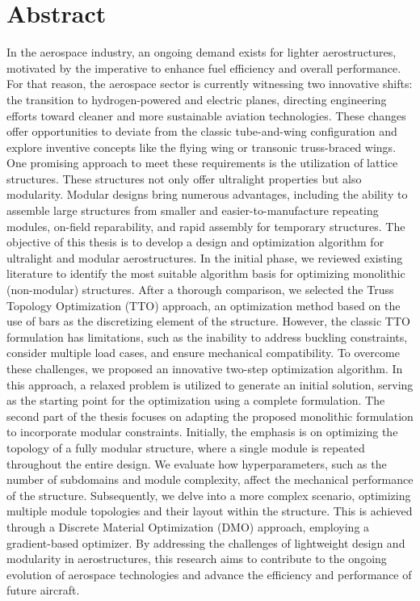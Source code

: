 \chapter*{Abstract}
{}%
%
In the aerospace industry, an ongoing demand exists for lighter aerostructures, motivated by the imperative to enhance fuel efficiency and overall performance. For that reason, the aerospace sector is currently witnessing two innovative shifts: the transition to hydrogen-powered and electric planes, directing engineering efforts toward cleaner and more sustainable aviation technologies. These changes offer opportunities to deviate from the classic tube-and-wing configuration and explore inventive concepts like the flying wing or transonic truss-braced wings. One promising approach to meet these requirements is the utilization of lattice structures. These structures not only offer ultralight properties but also modularity. Modular designs bring numerous advantages, including the ability to assemble large structures from smaller and easier-to-manufacture repeating modules, on-field reparability, and rapid assembly for temporary structures.
The objective of this thesis is to develop a design and optimization algorithm for ultralight and modular aerostructures. In the initial phase, we reviewed existing literature to identify the most suitable algorithm basis for optimizing monolithic (non-modular) structures. After a thorough comparison, we selected the Truss Topology Optimization (TTO) approach, an optimization method based on the use of bars as the discretizing element of the structure. However, the classic TTO formulation has limitations, such as the inability to address buckling constraints, consider multiple load cases, and ensure mechanical compatibility. To overcome these challenges, we proposed an innovative two-step optimization algorithm. In this approach, a relaxed problem is utilized to generate an initial solution, serving as the starting point for the optimization using a complete formulation.
The second part of the thesis focuses on adapting the proposed monolithic formulation to incorporate modular constraints. Initially, the emphasis is on optimizing the topology of a fully modular structure, where a single module is repeated throughout the entire design. We evaluate how hyperparameters, such as the number of subdomains and module complexity, affect the mechanical performance of the structure. Subsequently, we delve into a more complex scenario, optimizing multiple module topologies and their layout within the structure. This is achieved through a Discrete Material Optimization (DMO) approach, employing a gradient-based optimizer.
By addressing the challenges of lightweight design and modularity in aerostructures, this research aims to contribute to the ongoing evolution of aerospace technologies and advance the efficiency and performance of future aircraft.


